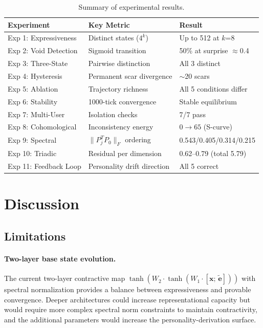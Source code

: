 \documentclass[11pt]{article}
\begin{document}
\begin{table}[ht]
\centering
\small
\begin{tabular}{lll}
\toprule
\textbf{Experiment} & \textbf{Key Metric} & \textbf{Result} \\
\midrule
Exp 1: Expressiveness & Distinct states ($4^k$) & Up to 512 at $k$=8 \\
Exp 2: Void Detection & Sigmoid transition & 50\% at surprise $\approx$0.4 \\
Exp 3: Three-State & Pairwise distinction & All 3 distinct \\
Exp 4: Hysteresis & Permanent scar divergence & $\sim$20 scars \\
Exp 5: Ablation & Trajectory richness & All 5 conditions differ \\
Exp 6: Stability & 1000-tick convergence & Stable equilibrium \\
Exp 7: Multi-User & Isolation checks & 7/7 pass \\
Exp 8: Cohomological & Inconsistency energy & $0 \to 65$ (S-curve) \\
Exp 9: Spectral & $\|P_j^T P_0\|_F$ ordering & 0.543/0.405/0.314/0.215 \\
Exp 10: Triadic & Residual per dimension & 0.62--0.79 (total 5.79) \\
Exp 11: Feedback Loop & Personality drift direction & All 5 correct \\
\bottomrule
\end{tabular}
\caption{Summary of experimental results.}
\label{tab:results}
\end{table}

\section{Discussion}
\label{sec:discussion}

\subsection{Limitations}

\paragraph{Two-layer base state evolution.} The current two-layer contractive map $\tanh(W_2 \cdot \tanh(W_1 \cdot [\mathbf{x};\, \tilde{\mathbf{e}}]))$ with spectral normalization provides a balance between expressiveness and provable convergence. Deeper architectures could increase representational capacity but would require more complex spectral norm constraints to maintain contractivity, and the additional parameters would increase the personality-derivation surface.
\end{document}
